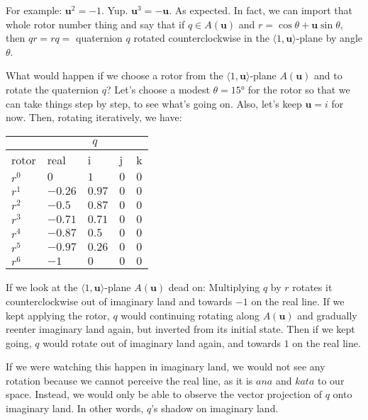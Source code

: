 \documentclass[12pt]{article}
\begin{document}
	For example: $\mathbf{u}^2 = -1$. 
	Yup. 
	$\mathbf{u}^3 = -\mathbf{u}$. 
	As expected. 
	In fact, we can import that whole rotor number thing and say that if $q \in A(\mathbf{u})$ and $r = \cos\theta + \mathbf{u}\sin\theta$, then $qr = rq = $ quaternion $q$ rotated counterclockwise in the $\langle 1, \mathbf{u} \rangle$-plane by angle $\theta$.
	
	What would happen if we choose a rotor from the $\langle 1, \mathbf{u} \rangle$-plane $A(\mathbf{u})$ and to rotate the quaternion $q$?
	Let's choose a modest $\theta = 15\si{\degree}$ for the rotor so that we can take things step by step, to see what's going on. 
	Also, let's keep $\mathbf{u} = i$ for now. 
	Then, rotating iteratively, we have:
	
	\begin{tabular}{|p{1cm} | p{1.1cm} | p{1.1cm} | p{1.1cm} | p{1.1cm}|}
		\hline
		 &  \multicolumn{4}{c}{$q$} \\ 
 		\hline
 		rotor & real & i & j & k\\
 		\hline
 		$r^0$ & $0    $ & $1   $ & $0$ & $0$\\ \hline
		$r^1$ & $-0.26$ & $0.97$ & $0$ & $0$\\ \hline
		$r^2$ & $-0.5 $ & $0.87$ & $0$ & $0$\\ \hline
		$r^3$ & $-0.71$ & $0.71$ & $0$ & $0$\\ \hline
		$r^4$ & $-0.87$ & $0.5 $ & $0$ & $0$\\ \hline
		$r^5$ & $-0.97$ & $0.26$ & $0$ & $0$\\ \hline
		$r^6$ & $-1   $ & $0   $ & $0$ & $0$\\ \hline
	\end{tabular}
	
	If we look at the $\langle 1, \mathbf{u} \rangle$-plane $A(\mathbf{u})$ dead on: 
	Multiplying $q$ by $r$ rotates it counterclockwise out of imaginary land and towards $-1$ on the real line. 
	If we kept applying the rotor, $q$ would continuing rotating along $A(\mathbf{u})$ and gradually reenter imaginary land again, but inverted from its initial state. 
	Then if we kept going, $q$ would rotate out of imaginary land again, and towards $1$ on the real line.
	
	If we were watching this happen in imaginary land, we would not see any rotation because we cannot perceive the real line, as it is $ana$ and $kata$ to our space. 
	Instead, we would only be able to observe the vector projection of $q$ onto imaginary land. 
	In other words, $q$'s shadow on imaginary land.
	
\end{document}
